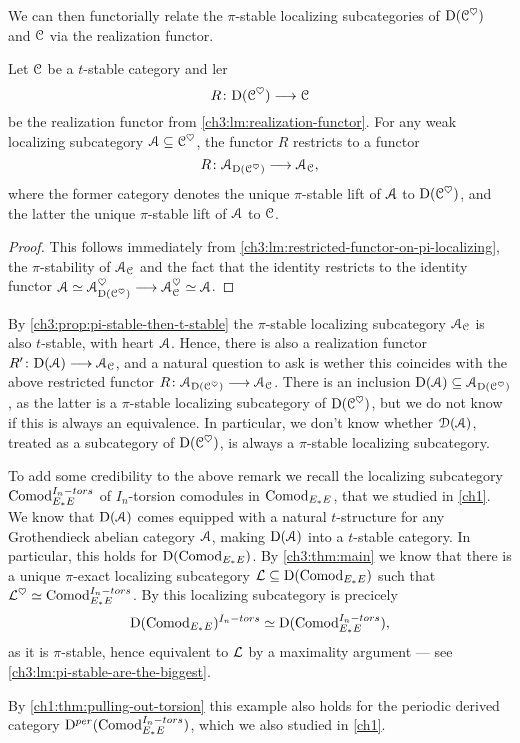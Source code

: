 We can then functorially relate the $\pi$-stable localizing subcategories of $\mathrm{D}(\EuScript{C}^\heartsuit)$ and $\EuScript{C}$ via the realization functor. 

\begin{corollary}
    Let $\EuScript{C}$ be a $t$-stable category and ler 
    \[R\colon \mathrm{D}(\EuScript{C}^\heartsuit)\longrightarrow \EuScript{C}\]
    be the realization functor from \cref{ch3:lm:realization-functor}. For any weak localizing subcategory $\EuScript{A}\subseteq \EuScript{C}^\heartsuit$, the functor $R$ restricts to a functor
    \[R\colon \EuScript{A}_{\mathrm{D}(\EuScript{C}^\heartsuit)}\longrightarrow \EuScript{A}_{\EuScript{C}},\]
    where the former category denotes the unique $\pi$-stable lift of $\EuScript{A}$ to $\mathrm{D}(\EuScript{C}^\heartsuit)$, and the latter the unique $\pi$-stable lift of $\EuScript{A}$ to $\EuScript{C}$. 
\end{corollary}
\begin{proof}
    This follows immediately from \cref{ch3:lm:restricted-functor-on-pi-localizing}, the $\pi$-stability of $\EuScript{A}_{\EuScript{C}}$ and the fact that the identity restricts to the identity functor $\EuScript{A}\simeq\EuScript{A}_{\mathrm{D}(\EuScript{C}^\heartsuit)}^\heartsuit \longrightarrow \EuScript{A}_{\EuScript{C}}^\heartsuit\simeq \EuScript{A}$. 
\end{proof}

\begin{remark}
    By \cref{ch3:prop:pi-stable-then-t-stable} the $\pi$-stable localizing subcategory $\EuScript{A}_{\EuScript{C}}$ is also $t$-stable, with heart $\EuScript{A}$. Hence, there is also a realization functor $R'\colon \mathrm{D}(\EuScript{A})\longrightarrow \EuScript{A}_{\EuScript{C}}$, and a natural question to ask is wether this coincides with the above restricted functor $R\colon \EuScript{A}_{\mathrm{D}(\EuScript{C}^\heartsuit)}\longrightarrow \EuScript{A}_{\EuScript{C}}$. There is an inclusion $\mathrm{D}(\EuScript{A})\subseteq \EuScript{A}_{\mathrm{D}(\EuScript{C}^\heartsuit)}$, as the latter is a $\pi$-stable localizing subcategory of $\mathrm{D}(\EuScript{C}^\heartsuit)$, but we do not know if this is always an equivalence. In particular, we don't know whether $\EuScript{D}(\EuScript{A})$, treated as a subcategory of $\mathrm{D}(\EuScript{C}^\heartsuit)$, is always a $\pi$-stable localizing subcategory. 
\end{remark}

\begin{addendum}
    To add some credibility to the above remark we recall 
    the localizing subcategory $\mathrm{Comod}_{E_*E}^{I_n-tors}$ of $I_n$-torsion comodules in $\mathrm{Comod}_{E_*E}$, that we studied in \cref{ch1}. We know that $\mathrm{D}(\EuScript{A})$ comes equipped with a natural $t$-structure for any Grothendieck abelian category $\EuScript{A}$, making $\mathrm{D}(\EuScript{A})$ into a $t$-stable category. In particular, this holds for $\mathrm{D}(\mathrm{Comod}_{E_*E})$. By \cref{ch3:thm:main} we know that there is a unique $\pi$-exact localizing subcategory $\mathcal{L} \subseteq \mathrm{D}(\mathrm{Comod}_{E_*E})$ such that $\mathcal{L}^\heartsuit \simeq \mathrm{Comod}_{E_*E}^{I_n-tors}$. By \cite[3.7(2)]{barthel-heard-valenzuela_2020} this localizing subcategory is precicely 
    \[\mathrm{D}(\mathrm{Comod}_{E_*E})^{I_n-tors} \simeq \mathrm{D}(\mathrm{Comod}_{E_*E}^{I_n-tors}),\]
    as it is $\pi$-stable, hence equivalent to $\mathcal{L}$ by a maximality argument --- see \cref{ch3:lm:pi-stable-are-the-biggest}. 

    By \cref{ch1:thm:pulling-out-torsion} this example also holds for the periodic derived category $\mathrm{D}^{per}(\mathrm{Comod}_{E_*E}^{I_n-tors})$, which we also studied in \cref{ch1}. 
\end{addendum}













